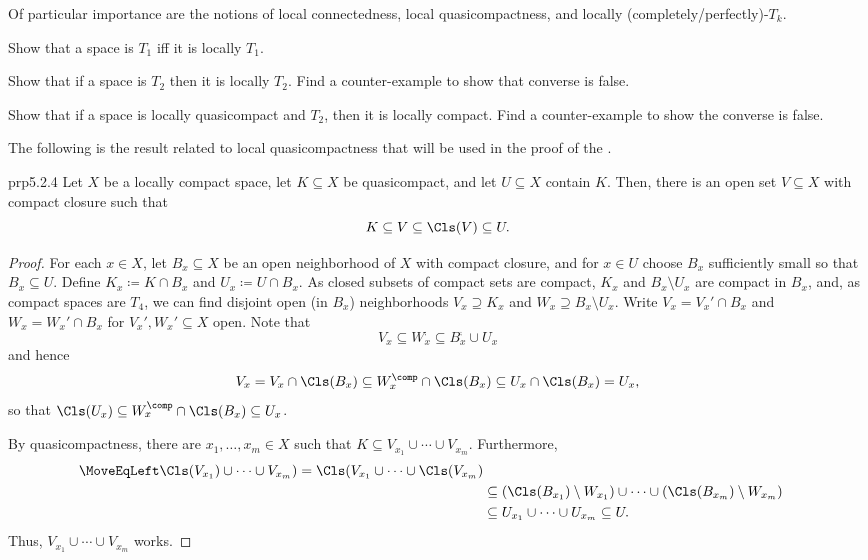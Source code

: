 Of particular importance are the notions of local connectedness, local quasicompactness, and locally (completely/perfectly)-$T_k$.
\begin{exr}{}{}
Show that a space is $T_1$ iff it is locally $T_1$.
\end{exr}
\begin{exr}{}{}
Show that if a space is $T_2$ then it is locally $T_2$.  Find a counter-example to show that converse is false.
\end{exr}
\begin{exr}{}{}
Show that if a space is locally quasicompact and $T_2$, then it is locally compact.  Find a counter-example to show the converse is false.
\end{exr}
The following is the result related to local quasicompactness that will be used in the proof of the .
\begin{prp}{}{prp5.2.4}
Let $X$ be a locally compact space, let $K\subseteq X$ be quasicompact, and let $U\subseteq X$ contain $K$.  Then, there is an open set $V\subseteq X$ with compact closure such that
\begin{equation}
K\subseteq V\subseteq \Cls (V)\subseteq U.
\end{equation}
\begin{proof}
For each $x\in X$, let $B_x\subseteq X$ be an open neighborhood of $X$ with compact closure, and for $x\in U$ choose $B_x$ sufficiently small so that $B_x\subseteq U$.  Define $K_x\coloneqq K\cap B_x$ and $U_x\coloneqq U\cap B_x$.  As closed subsets of compact sets are compact, $K_x$ and $B_x\setminus U_x$ are compact in $B_x$, and, as compact spaces are $T_4$, we can find disjoint open (in $B_x$) neighborhoods $V_x\supseteq K_x$ and $W_x\supseteq B_x\setminus U_x$.  Write $V_x=V_x'\cap B_x$ and $W_x=W_x'\cap B_x$ for $V_x',W_x'\subseteq X$ open.  Note that
\begin{equation}
V_x\subseteq W_x^{\comp}\subseteq B_x^{\comp}\cup U_x
\end{equation}
and hence
\begin{equation}
V_x=V_x\cap \Cls (B_x)\subseteq W_x^{\comp}\cap \Cls (B_x)\subseteq U_x\cap \Cls (B_x)=U_x,
\end{equation}
so that $\Cls (U_x)\subseteq W_x^{\comp}\cap \Cls (B_x)\subseteq U_x$.

By quasicompactness, there are $x_1,\ldots ,x_m\in X$ such that $K\subseteq V_{x_1}\cup \cdots \cup V_{x_m}$.  Furthermore,
\begin{equation}
\begin{split}
\MoveEqLeft
\Cls (V_{x_1})\cup \cdots \cup V_{x_m})=\Cls (V_{x_1}\cup \cdots \cup \Cls (V_{x_m}) \\
& \subseteq (\Cls (B_{x_1})\setminus W_{x_1})\cup \cdots \cup (\Cls (B_{x_m})\setminus W_{x_m}) \\
& \subseteq U_{x_1}\cup \cdots \cup U_{x_m}\subseteq U.
\end{split}
\end{equation}
Thus, $V_{x_1}\cup \cdots \cup V_{x_m}$ works.
\end{proof}
\end{prp}

